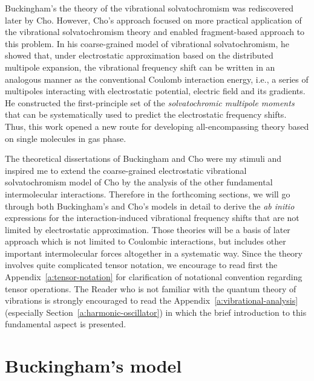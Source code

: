 \documentclass[a4paper,titlepage,twoside,fleqn,12pt]{book}
\begin{document}
\begin{refsection}
Buckingham's the theory of the vibrational solvatochromism was rediscovered later 
by Cho. \citep{Cho.JCP.2003,Cho.JCP.2009} 
However, Cho's 
approach focused on more practical application of the vibrational solvatochromism 
theory and enabled fragment\hyp{}based approach to this problem. In his coarse\hyp{}grained
model of vibrational solvatochromism, he showed that,
under electrostatic approximation based on the distributed multipole expansion, 
the vibrational frequency shift can be written in an analogous manner as the conventional
Coulomb interaction energy, i.e., a series of multipoles interacting with
electrostatic potential, electric field and its gradients. 
He constructed the first\hyp{}principle set of 
the \emph{solvatochromic multipole moments} that can be systematically used
to predict the electrostatic frequency shifts. Thus, this work opened a new route for developing
all\hyp{}encompassing theory based on single molecules in gas phase.

The theoretical dissertations of Buckingham and Cho were my stimuli and inspired
me to extend the coarse\hyp{}grained electrostatic vibrational solvatochromism 
model of Cho by the analysis of the other fundamental intermolecular interactions.
Therefore in the forthcoming sections, we will go through both Buckingham's and Cho's
models in detail
to derive the \emph{ab initio} expressions for the interaction\hyp{}induced 
vibrational frequency shifts that are not limited by electrostatic approximation.
Those theories will be a basis of later approach which is not limited to
Coulombic interactions, but includes other important intermolecular forces altogether
in a systematic way. Since the theory involves quite complicated
tensor notation, we encourage to read first the Appendix~\ref{a:tensor-notation}
for clarification of notational convention regarding tensor operations.
The Reader who is not familiar with the quantum theory of vibrations is strongly encouraged
to read the Appendix~\ref{a:vibrational-analysis} 
(especially Section~\ref{a:harmonic-oscillator})
in which the brief introduction to this fundamental aspect is presented.

\section{Buckingham's model  \label{s:buckingham-theory}}


\end{refsection}
\end{document}

